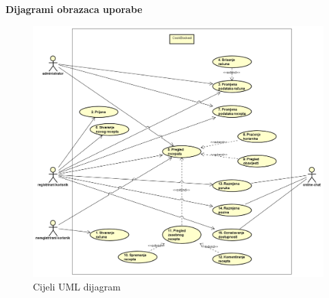 						
						
					
					\eject
					\noindent \textbf{Dijagrami obrazaca uporabe}
					
					\begin{figure}[H]
						\centering
						\includegraphics[width=1.2\linewidth]{"slike/dijagrami/UML cijeli"}
						\caption{Cijeli UML dijagram}
						\label{fig:uml-cijeli}
					\end{figure}
				

